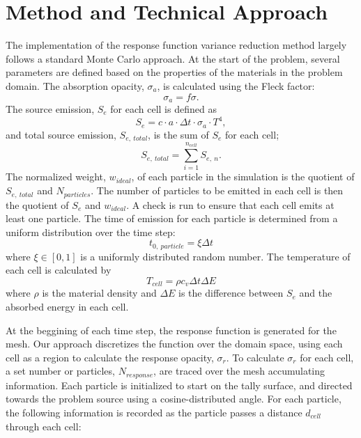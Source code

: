 \documentclass[]{article}
\begin{document}
\section{Method and Technical Approach}
	The implementation of the response function variance reduction method largely follows a standard Monte Carlo approach. At the start of the problem, several parameters are defined based on the properties of the materials in the problem domain. The absorption opacity, $\sigma_{a}$, is calculated using the Fleck factor:
	\begin{equation}
	\sigma_{a} = f \sigma.
	\end{equation}The source emission, $S_{e}$ for each cell is defined as
	\begin{equation}
		S_{e} = c \cdot a \cdot \Delta t \cdot \sigma_{a}  \cdot T^{4},
	\end{equation}
	and total source emission, $S_{e,~total}$, is the sum of $S_{e}$ for each cell;
	\begin{equation}
		S_{e,~total} = \sum_{i = 1}^{n_{cell}} S_{e,~n}.
	\end{equation}
	The normalized weight, $w_{ideal}$, of each particle in the simulation is the quotient of $S_{e,~total}$ and $N_{particles}$. The number of particles to be emitted in each cell is then the quotient of $S_{e}$ and $w_{ideal}$. A check is run to ensure that each cell emits at least one particle. The time of emission for each particle is determined from a uniform distribution over the time step:
	\begin{equation}
		t_{0,~particle} = \xi \Delta t
	\end{equation}
	where $\xi \in [0,1]$ is a uniformly distributed random number. The temperature of each cell is calculated by
	\begin{equation} \label{Eq: cell_T}
		T_{cell} = \rho c_{v} \Delta t \Delta E
	\end{equation}
	where $\rho$ is the material density and $\Delta E$ is the difference between $S_{e}$ and the absorbed energy in each cell.

At the beggining of each time step, the response function is generated for the mesh. Our approach discretizes the function over the domain space, using each cell as a region to calculate the response opacity, $\sigma_{r}$. To calculate $\sigma_{r}$ for each cell, a set number or particles, $N_{response}$, are traced over the mesh accumulating information. Each particle is initialized to start on the tally surface, and directed towards the problem source using a cosine-distributed angle. For each particle, the following information is recorded as the particle passes a distance $d_{cell}$ through each cell:
\end{document}
